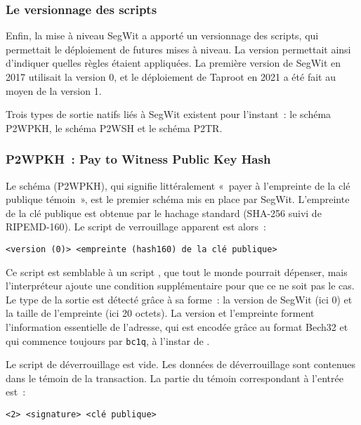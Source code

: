 
\subsubsection*{Le versionnage des scripts} Enfin, la mise à niveau SegWit a apporté un versionnage des scripts, qui permettait le déploiement de futures mises à niveau. La version permettait ainsi d'indiquer quelles règles étaient appliquées. La première version de SegWit en 2017 utilisait la version 0, et le déploiement de Taproot en 2021 a été fait au moyen de la version 1.


Trois types de sortie natifs liés à SegWit existent pour l'instant~: le schéma P2WPKH, le schéma P2WSH et le schéma P2TR.

\subsubsection*{P2WPKH~: Pay to Witness Public Key Hash} Le schéma  (P2WPKH), qui signifie littéralement «~payer à l'empreinte de la clé publique témoin~», est le premier schéma mis en place par SegWit. L'empreinte de la clé publique est obtenue par le hachage standard (SHA-256 suivi de RIPEMD-160). Le script de verrouillage apparent est alors~:

\begin{Verbatim}[fontsize=\footnotesize]
<version (0)> <empreinte (hash160) de la clé publique>
\end{Verbatim}

Ce script est semblable à un script , que tout le monde pourrait dépenser, mais l'interpréteur ajoute une condition supplémentaire pour que ce ne soit pas le cas. Le type de la sortie est détecté grâce à sa forme~: la version de SegWit (ici 0) et la taille de l'empreinte (ici 20 octets). La version et l'empreinte forment l'information essentielle de l'adresse, qui est encodée grâce au format Bech32 et qui commence toujours par \texttt{bc1q}, à l'instar de .

Le script de déverrouillage est vide. Les données de déverrouillage sont contenues dans le témoin de la transaction. La partie du témoin correspondant à l'entrée est~:

\begin{Verbatim}[fontsize=\footnotesize]
<2> <signature> <clé publique>
\end{Verbatim}

